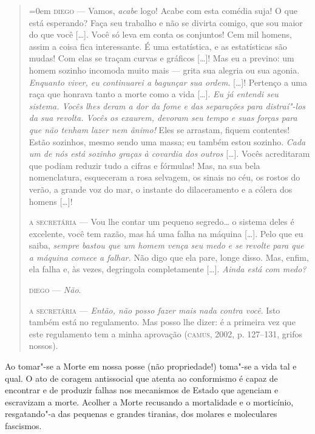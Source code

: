 \begin{quote}\parindent=0em
\textsc{diego} ---
Vamos, \textit{acabe} logo! Acabe com esta comédia suja! O que está
esperando? Faça seu trabalho e não se divirta comigo, que sou maior do
que você {[}\ldots{}{]}. Você só leva em conta os conjuntos! Cem mil homens,
assim a coisa fica interessante. É uma estatística, e as estatísticas
são mudas! Com elas se traçam curvas e gráficos {[}\ldots{}{]}! Mas eu a
previno: um homem sozinho incomoda muito mais --- grita sua alegria ou
sua agonia. \textit{Enquanto viver, eu continuarei a bagunçar sua
ordem}. {[}\ldots{}{]}! Pertenço a uma raça que honrava tanto a morte como a
vida {[}\ldots{}{]}. \textit{Eu já entendi seu sistema. Vocês lhes deram a
dor da fome e das separações para distraí"-los da sua revolta. Vocês os
exaurem, devoram seu tempo e suas forças para que não tenham lazer nem
ânimo!} Eles se arrastam, fiquem contentes! Estão sozinhos, mesmo sendo
uma massa; eu também estou sozinho. \textit{Cada um de nós está sozinho
graças à covardia dos outros} {[}\ldots{}{]}. Vocês acreditaram que podiam
reduzir tudo a cifras e fórmulas! Mas, na sua bela nomenclatura,
esqueceram a rosa selvagem, os sinais no céu, os rostos do verão, a
grande voz do mar, o instante do dilaceramento e a cólera dos homens
{[}\ldots{}{]}!

\textsc{a secretária} ---
Vou lhe contar um pequeno segredo\ldots{} o sistema deles é excelente, você
tem razão, mas há uma falha na máquina {[}\ldots{}{]}. Pelo que eu saiba,
\textit{sempre bastou que um homem vença seu medo e se revolte para que
a máquina comece a falhar.} Não digo que ela pare, longe disso. Mas,
enfim, ela falha e, às vezes, degringola completamente {[}\ldots{}{]}.
\textit{Ainda está com medo?}

\textsc{diego} ---
\textit{Não}.

\textsc{a secretária} ---
\textit{Então, não posso fazer mais nada contra você}. Isto também está
no regulamento. Mas posso lhe dizer: é a primeira vez que este
regulamento tem a minha aprovação (\textsc{camus}, 2002, p. 127--131, grifos
nossos).
\end{quote}

Ao tomar"-se a Morte em nossa posse (não propriedade!) toma"-se a vida tal
e qual. O ato de coragem antissocial que atenta ao conformismo é capaz
de encontrar e de produzir falhas nos mecanismos de Estado que agenciam
e escravizam a morte. Acolher a Morte recusando a mortalidade e o
morticínio, resgatando"-a das pequenas e grandes tiranias, dos molares e
moleculares fascismos.

